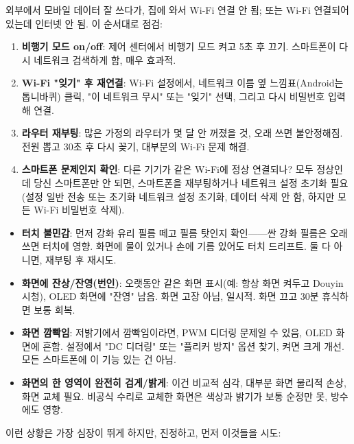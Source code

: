 
외부에서 모바일 데이터 잘 쓰다가, 집에 와서 Wi-Fi 연결 안 됨; 또는 Wi-Fi 연결되어 있는데 인터넷 안 됨. 이 순서대로 점검:

\begin{enumerate}
  \item \textbf{비행기 모드 on/off}: 제어 센터에서 비행기 모드 켜고 5초 후 끄기. 스마트폰이 다시 네트워크 검색하게 함, 매우 효과적.
  \item \textbf{Wi-Fi "잊기" 후 재연결}: Wi-Fi 설정에서, 네트워크 이름 옆 느낌표(Android는 톱니바퀴) 클릭, "이 네트워크 무시" 또는 "잊기" 선택, 그리고 다시 비밀번호 입력해 연결.
  \item \textbf{라우터 재부팅}: 많은 가정의 라우터가 몇 달 안 꺼졌을 것, 오래 쓰면 불안정해짐. 전원 뽑고 30초 후 다시 꽂기, 대부분의 Wi-Fi 문제 해결.
  \item \textbf{스마트폰 문제인지 확인}: 다른 기기가 같은 Wi-Fi에 정상 연결되나? 모두 정상인데 당신 스마트폰만 안 되면, 스마트폰을 재부팅하거나 네트워크 설정 초기화 필요(설정 일반 전송 또는 초기화 네트워크 설정 초기화, 데이터 삭제 안 함, 하지만 모든 Wi-Fi 비밀번호 삭제).
\end{enumerate}


\begin{itemize}
  \item \textbf{터치 불민감}: 먼저 강화 유리 필름 떼고 필름 탓인지 확인——싼 강화 필름은 오래 쓰면 터치에 영향. 화면에 물이 있거나 손에 기름 있어도 터치 드리프트. 둘 다 아니면, 재부팅 후 재시도.
  \item \textbf{화면에 잔상/잔영(번인)}: 오랫동안 같은 화면 표시(예: 항상 화면 켜두고 Douyin 시청), OLED 화면에 "잔영" 남음. 화면 고장 아님, 일시적. 화면 끄고 30분 휴식하면 보통 회복.
  \item \textbf{화면 깜빡임}: 저밝기에서 깜빡임이라면, PWM 디더링 문제일 수 있음, OLED 화면에 흔함. 설정에서 "DC 디더링" 또는 "플리커 방지" 옵션 찾기, 켜면 크게 개선. 모든 스마트폰에 이 기능 있는 건 아님.
  \item \textbf{화면의 한 영역이 완전히 검게/밝게}: 이건 비교적 심각, 대부분 화면 물리적 손상, 화면 교체 필요. 비공식 수리로 교체한 화면은 색상과 밝기가 보통 순정만 못, 방수에도 영향.
\end{itemize}


이런 상황은 가장 심장이 뛰게 하지만, 진정하고, 먼저 이것들을 시도:

